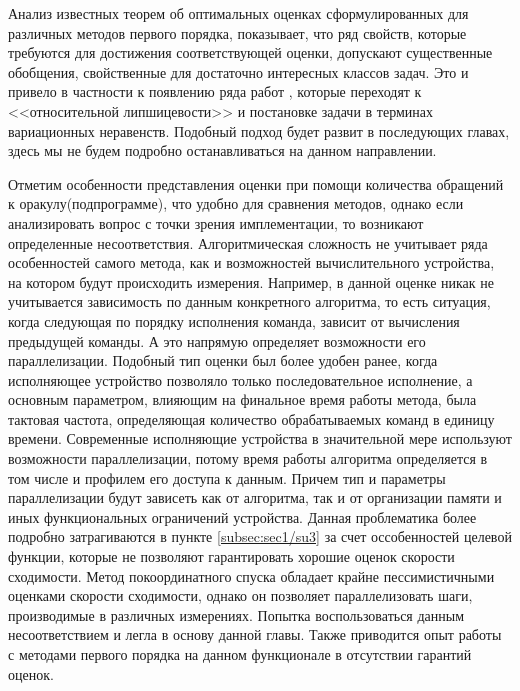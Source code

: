   Анализ известных теорем об оптимальных оценках сформулированных для различных методов первого порядка, показывает, что ряд свойств, которые требуются для достижения соответствующей оценки, допускают существенные обобщения, свойственные для достаточно интересных классов задач. Это и привело в частности к появлению ряда работ \cite{Dragomir, Lu_2018, Lu_Nesterov_2018, Fedor_relative_adapuniv}, которые переходят к <<относительной липшицевости>> и постановке задачи в терминах вариационных неравенств. Подобный подход будет развит в последующих главах, здесь мы не будем подробно останавливаться на данном направлении.

  Отметим особенности представления оценки при помощи количества обращений к оракулу(подпрограмме), что удобно для сравнения методов, однако если анализировать вопрос с точки зрения имплементации, то возникают определенные несоответствия. Алгоритмическая сложность не учитывает ряда особенностей самого метода, как и возможностей вычислительного устройства, на котором будут происходить измерения. Например, в данной оценке никак не учитывается зависимость по данным конкретного алгоритма, то есть ситуация, когда следующая по порядку исполнения команда, зависит от вычисления предыдущей команды. А это напрямую определяет возможности его параллелизации. Подобный тип оценки был более удобен ранее, когда исполняющее устройство позволяло только последовательное исполнение, а основным параметром, влияющим на финальное время работы метода, была тактовая частота, определяющая количество обрабатываемых команд в единицу времени. Современные исполняющие устройства в значительной мере используют возможности параллелизации, потому время работы алгоритма определяется в том числе и профилем его доступа к данным. Причем тип и параметры параллелизации будут зависеть как от алгоритма, так и от организации памяти и иных функциональных ограничений устройства. Данная проблематика более подробно затрагиваются в пункте \ref{subsec:sec1/su3} за счет оссобенностей целевой функции, которые не позволяют гарантировать хорошие оценок скорости сходимости.  Метод покоординатного спуска обладает крайне пессимистичными оценками скорости сходимости, однако он позволяет параллелизовать шаги, производимые в различных измерениях. Попытка воспользоваться данным несоответствием и легла в основу данной главы. Также приводится опыт работы с методами первого порядка на данном функционале в отсутствии гарантий оценок. 

